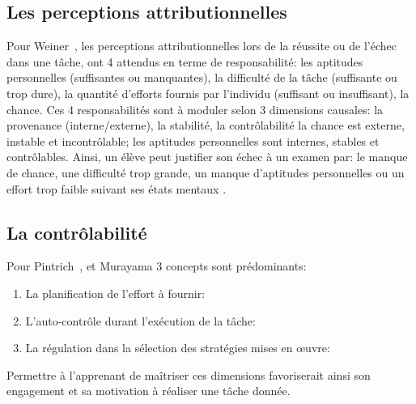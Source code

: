     \subsection{Les perceptions attributionnelles}
        Pour Weiner~, les perceptions attributionnelles lors de la réussite ou de l'échec dans une tâche, ont 4 attendus en terme de responsabilité: \Li les aptitudes personnelles (suffisantes ou manquantes), \ii la difficulté de la tâche (suffisante ou trop dure), \iii la quantité d’efforts fournis par l'individu (suffisant ou insuffisant), \iiii la chance. Ces 4 responsabilités sont à moduler selon 3 dimensions causales: la provenance (interne/externe), la stabilité, la contrôlabilité \eg la chance est externe, instable et incontrôlable; les aptitudes personnelles sont internes, stables et contrôlables. Ainsi, un élève peut justifier son échec à un examen par: le manque de chance, une difficulté trop grande, un manque d'aptitudes personnelles ou un effort trop faible suivant ses états mentaux .
    \subsection{La contrôlabilité}\label{sec:contro}
        Pour Pintrich~, et Murayama 3 concepts sont prédominants:
        \begin{enumerate}\myItemStyle
            \item La planification de l'effort à fournir:  \item L'auto-contrôle durant l'exécution de la tâche: 
            \item La régulation dans la sélection des stratégies mises en œuvre: 
        \end{enumerate}{}\par%
        Permettre à l'apprenant de maîtriser ces dimensions favoriserait ainsi son engagement et sa motivation à réaliser une tâche donnée.

